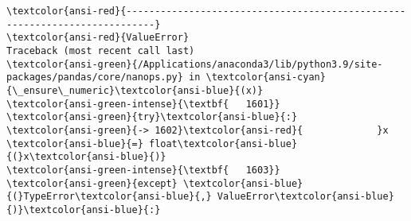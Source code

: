 \documentclass[11pt]{article}
\begin{document}
    \begin{Verbatim}[commandchars=\\\{\}, frame=single, framerule=2mm, rulecolor=\color{outerrorbackground}]
\textcolor{ansi-red}{---------------------------------------------------------------------------}
\textcolor{ansi-red}{ValueError}                                Traceback (most recent call last)
\textcolor{ansi-green}{/Applications/anaconda3/lib/python3.9/site-packages/pandas/core/nanops.py} in \textcolor{ansi-cyan}{\_ensure\_numeric}\textcolor{ansi-blue}{(x)}
\textcolor{ansi-green-intense}{\textbf{   1601}}         \textcolor{ansi-green}{try}\textcolor{ansi-blue}{:}
\textcolor{ansi-green}{-> 1602}\textcolor{ansi-red}{             }x \textcolor{ansi-blue}{=} float\textcolor{ansi-blue}{(}x\textcolor{ansi-blue}{)}
\textcolor{ansi-green-intense}{\textbf{   1603}}         \textcolor{ansi-green}{except} \textcolor{ansi-blue}{(}TypeError\textcolor{ansi-blue}{,} ValueError\textcolor{ansi-blue}{)}\textcolor{ansi-blue}{:}


\end{Verbatim}
\end{document}
